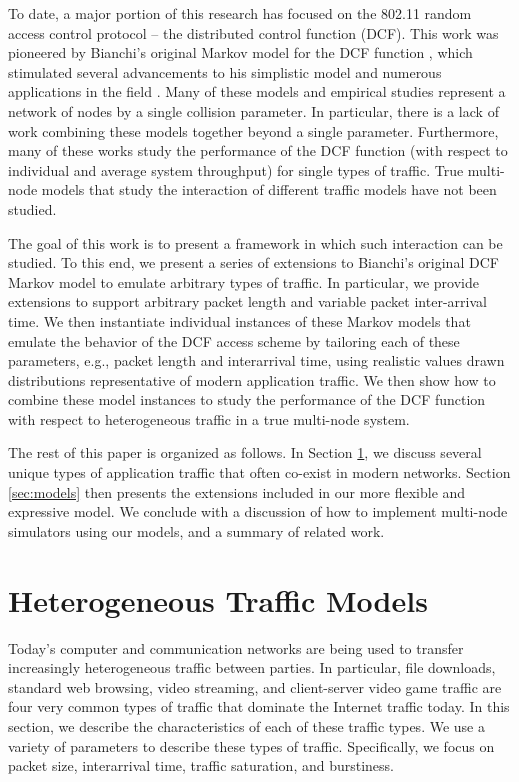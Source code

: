 \documentclass[conference]{IEEEtran}
\begin{document}
To date, a major portion of this research has focused on the 802.11 random access control protocol -- the distributed control function (DCF). This work was pioneered by Bianchi's original Markov model for the DCF function \cite{bianchi1996performance}, which stimulated several advancements to his simplistic model \cite{bianchi1998ieee} and numerous applications in the field \cite{crow1996performance,chhaya1997performance}. Many of these models and empirical studies represent a network of nodes by a single collision parameter. In particular, there is a lack of work combining these models together beyond a single parameter. Furthermore, many of these works study the performance of the DCF function (with respect to individual and average system throughput) for single types of traffic. True multi-node models that study the interaction of different traffic models have not been studied.

The goal of this work is to present a framework in which such interaction can be studied. To this end, we present a series of extensions to Bianchi's original DCF Markov model to emulate arbitrary types of traffic. In particular, we provide extensions to support arbitrary packet length and variable packet inter-arrival time. We then instantiate individual instances of these Markov models that emulate the behavior of the DCF access scheme by tailoring each of these parameters, e.g., packet length and interarrival time, using realistic values drawn distributions representative of modern application traffic. We then show how to combine these model instances to study the performance of the DCF function with respect to heterogeneous traffic in a true multi-node system. 

The rest of this paper is organized as follows. In Section \ref{sec:traffic}, we discuss several unique types of application traffic that often co-exist in modern networks. Section \ref{sec:models} then presents the extensions included in our more flexible and expressive model. We conclude with a discussion of how to implement multi-node simulators using our models, and a summary of related work.

\section{Heterogeneous Traffic Models} \label{sec:traffic}
Today's computer and communication networks are being used to transfer increasingly heterogeneous traffic between parties. In particular, file downloads, standard web browsing, video streaming, and client-server video game traffic are four very common types of traffic that dominate the Internet traffic today. In this section, we describe the characteristics of each of these traffic types. We use a variety of parameters to describe these types of traffic. Specifically, we focus on packet size, interarrival time, traffic saturation, and burstiness. 
\end{document}
